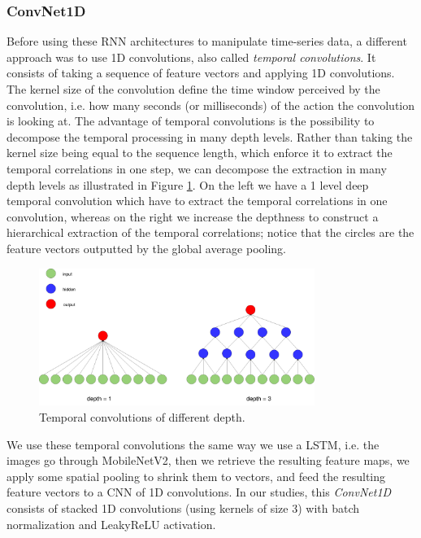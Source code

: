 \documentclass[12pt, a4paper]{report}
\begin{document}
				\subsubsection{ConvNet1D}
					Before using these RNN architectures to manipulate time-series data, a different approach was to use 1D convolutions, also called {\itshape temporal convolutions}.
					It consists of taking a sequence of feature vectors and applying 1D convolutions.
					The kernel size of the convolution define the time window perceived by the convolution, i.e. how many seconds (or milliseconds) of the action the convolution is looking at.
					The advantage of temporal convolutions is the possibility to decompose the temporal processing in many depth levels.
					Rather than taking the kernel size being equal to the sequence length, which enforce it to extract the temporal correlations in one step, we can decompose the extraction in many depth levels as illustrated in Figure \ref{temp_conv}.
					On the left we have a 1 level deep temporal convolution which have to extract the temporal correlations in one convolution, whereas on the right we increase the depthness to construct a hierarchical extraction of the temporal correlations; notice that the circles are the feature vectors outputted by the global average pooling.
					\begin{figure}[h!]
						\centering
						\includegraphics[width=0.8\textwidth]{temporal_convolution.png}
						\caption{Temporal convolutions of different depth.}\label{temp_conv}
					\end{figure}
					\par
					We use these temporal convolutions the same way we use a LSTM, i.e. the images go through MobileNetV2, then we retrieve the resulting feature maps, we apply some spatial pooling to shrink them to vectors, and feed the resulting feature vectors to a CNN of 1D convolutions.
					In our studies, this {\itshape ConvNet1D} consists of stacked 1D convolutions (using kernels of size 3) with batch normalization and LeakyReLU activation.
\end{document}
